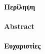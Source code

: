 \maketitle
\tableofcontents
\listoffigures
\listoftables


\thispagestyle{empty}
\paragraph{ Περίληψη}
\thispagestyle{empty}
\paragraph{  Abstract}
\thispagestyle{empty}
\paragraph{  Ευχαριστίες}
